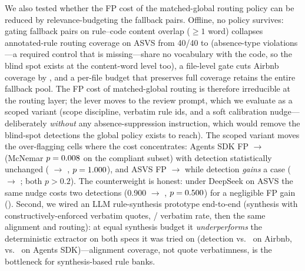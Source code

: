 \documentclass[11pt]{article}
\begin{document}
We also tested whether the FP cost of the matched-global routing policy can be
reduced by relevance-budgeting the fallback pairs. Offline, no policy
survives: gating fallback pairs on rule--code content overlap ($\geq 1$ word)
collapses annotated-rule routing coverage on ASVS from 40/40 to \routAsvsPoneCov{}
(absence-type violations---a required control that is missing---share no
vocabulary with the code, so the blind spot exists at the content-word level
too), a file-level gate cuts Airbnb coverage by \routAirbnbGateLoss{}, and a
per-file budget that preserves full coverage retains the entire fallback pool.
The FP cost of matched-global routing is therefore irreducible at the routing
layer; the lever moves to the review prompt, which we evaluate as a scoped
variant (scope discipline, verbatim rule ids, and a soft calibration nudge---%
deliberately \emph{without} any absence-suppression instruction, which would
remove the blind-spot detections the global policy exists to reach). The
scoped variant moves the over-flagging cells where the cost concentrates:
Agents SDK FP \vThreeFpAgentsMx{} $\rightarrow$ \pTwoFpAgentsMx{}
(McNemar $p=0.008$ on the compliant subset) with detection
statistically unchanged (\vThreeDetAgentsMx{} $\rightarrow$ \pTwoDetAgentsMx,
$p=1.000$), and ASVS FP \vThreeFpAsvsMx{} $\rightarrow$
\pTwoFpAsvsMx{} while detection \emph{gains} a case
(\vThreeDetAsvsMx{} $\rightarrow$ \pTwoDetAsvsMx; both $p>0.2$). The
counterweight is honest: under DeepSeek on ASVS the same nudge costs two
detections (0.900 $\rightarrow$ \pTwoDetAsvsDs, $p=0.500$) for a
negligible FP gain (\pTwoFpAsvsDs). Second, we wired an LLM rule-synthesis
prototype end-to-end
(synthesis with constructively-enforced verbatim quotes,
\llmVerbatimAirbnb{}/\llmVerbatimAgents{} verbatim rate, then the same
alignment and routing): at equal synthesis budget it \emph{underperforms} the
deterministic extractor on both specs it was tried on (detection
\llmDetAirbnb{} vs.\ \mliteDetAirbnb{} on Airbnb,
\llmDetAgents{} vs.\ \mliteDetAgents{} on Agents SDK)---alignment coverage,
not quote verbatimness, is the bottleneck for synthesis-based rule banks.
\end{document}
